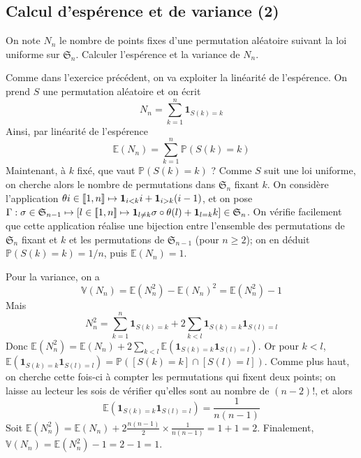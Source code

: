 \subsection{Calcul d'espérence et de variance (2)}
\begin{exercice}
    On note $N_n$ le nombre de points fixes d'une permutation aléatoire suivant la loi uniforme sur $\mathfrak S_n$.
    Calculer l'espérence et la variance de $N_n$.
\end{exercice}

\begin{correction}
    Comme dans l'exercice précédent, on va exploiter la linéarité de l'espérence. 
    On prend $S$ une permutation aléatoire et on écrit 
    \[
        N_n=\sum_{k=1}^n\mathbf1_{S(k)=k}
    \]
    Ainsi, par linéarité de l'espérence
    \[
        \mathbb E(N_n)=\sum_{k=1}^n \mathbb P(S(k)=k)
    \]
    Maintenant, à $k$ fixé, que vaut $\mathbb P(S(k)=k)$ ?
    Comme $S$ suit une loi uniforme, on cherche alors le nombre de permutations dans $\mathfrak S_n$ fixant $k$. 
    On considère l'application $\theta i\in[\![1,n]\!]\mapsto \mathbf1_{i<k}i+\mathbf1_{i > k}(i-1)$, et on pose 
    $\Gamma : \sigma \in \mathfrak S_{n-1}\mapsto [l\in[\![1,n]\!]\mapsto \mathbf1_{l\neq k}\sigma\circ\theta(l)+\mathbf1_{l=k}k]\in\mathfrak S_n$.
    On vérifie facilement que cette application réalise une bijection entre l'ensemble des permutations de $\mathfrak S_n$ fixant et $k$ et les permutations de $\mathfrak S_{n-1}$
    (pour $n\geq 2$); on en déduit $\mathbb P(S(k)=k)=1/n$, puis $\mathbb E(N_n)=1$.

    Pour la variance, on a 
    \[
        \mathbb V(N_n)=\mathbb E(N_n^2)-\mathbb E(N_n)^2=\mathbb E(N_n^2)-1
    \]
    Mais 
    \[
        N_n^2=\sum_{k=1}^n\mathbf1_{S(k)=k}+2\sum_{k<l}\mathbf1_{S(k)=k}\mathbf1_{S(l)=l}
    \]
    Donc $\mathbb E(N_n^2)=\mathbb E(N_n)+2\sum_{k<l}\mathbb E(\mathbf1_{S(k)=k}\mathbf1_{S(l)=l})$.
    Or pour $k<l$, $\mathbb E(\mathbf1_{S(k)=k}\mathbf1_{S(l)=l})=\mathbb P([S(k)=k]\cap[S(l)=l])$.
    Comme plus haut, on cherche cette fois-ci à compter les permutations qui fixent deux points; on laisse 
    au lecteur les sois de vérifier qu'elles sont au nombre de $(n-2)!$, et alors 
    \[
        \mathbb E(\mathbf1_{S(k)=k}\mathbf1_{S(l)=l})=\frac1{n(n-1)}
    \]
    Soit $\mathbb E(N_n^2)=\mathbb E(N_n)+2\frac{n(n-1)}2\times\frac1{n(n-1)}=1+1=2$.
    Finalement, $\mathbb V(N_n)=\mathbb E(N_n^2)-1=2-1=1$.

\end{correction}